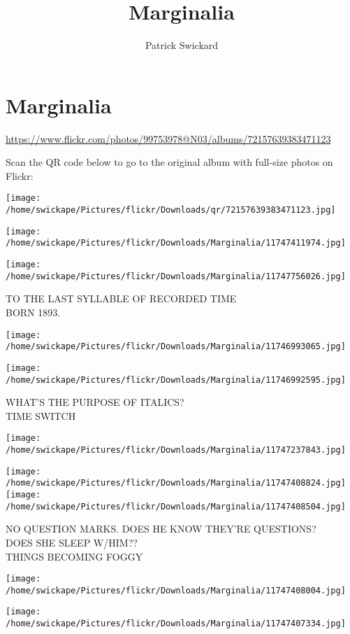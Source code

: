 \documentclass[10pt,letterpaper]{article}
\title{Marginalia}
\author{Patrick Swickard}
\date{}
\begin{document}
\section*{Marginalia}

\url{https://www.flickr.com/photos/99753978@N03/albums/72157639383471123}

Scan the QR code below to go to the original album with full-size photos on Flickr:

\texttt{[image: /home/swickape/Pictures/flickr/Downloads/qr/72157639383471123.jpg]}
\pagebreak

\texttt{[image: /home/swickape/Pictures/flickr/Downloads/Marginalia/11747411974.jpg]}

\vspace{0.25in}
\texttt{[image: /home/swickape/Pictures/flickr/Downloads/Marginalia/11747756026.jpg]}

TO THE LAST SYLLABLE OF RECORDED TIME\\
BORN 1893.
\pagebreak

\texttt{[image: /home/swickape/Pictures/flickr/Downloads/Marginalia/11746993065.jpg]}

\vspace{0.25in}
\texttt{[image: /home/swickape/Pictures/flickr/Downloads/Marginalia/11746992595.jpg]}

WHAT'S THE PURPOSE OF ITALICS?\\
TIME SWITCH
\pagebreak

\texttt{[image: /home/swickape/Pictures/flickr/Downloads/Marginalia/11747237843.jpg]}

\vspace{0.25in}
\texttt{[image: /home/swickape/Pictures/flickr/Downloads/Marginalia/11747408824.jpg]}
\texttt{[image: /home/swickape/Pictures/flickr/Downloads/Marginalia/11747408504.jpg]}

NO QUESTION MARKS.  DOES HE KNOW THEY'RE QUESTIONS?\\
DOES SHE SLEEP W/HIM??\\
THINGS BECOMING FOGGY
\pagebreak

\texttt{[image: /home/swickape/Pictures/flickr/Downloads/Marginalia/11747408004.jpg]}

\vspace{0.25in}
\texttt{[image: /home/swickape/Pictures/flickr/Downloads/Marginalia/11747407334.jpg]}
\end{document}
